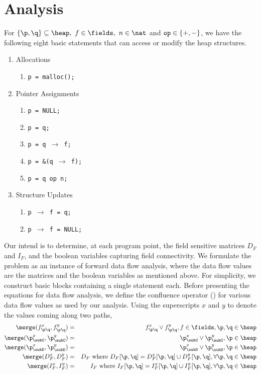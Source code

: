 \chapter{Analysis}\label{ch:Analysis}

For $\{\p, \q\} \subseteq \heap,\ f \in\fields,\ n \in \nat$
and $\mbox{\tt op} \in \{+, -\}$, 
we have the following eight basic statements that can access or modify the heap structures. 
\begin{enumerate}
  \item Allocations
  	\begin{enumerate}
    	\item {\tt p = malloc();}
  	\end{enumerate}
  \item Pointer Assignments
  	\begin{enumerate}
    	\item {\tt p = NULL;}
    	\item {\tt p = q;}
    	\item {\tt p = q $\rightarrow$ f;}
    	\item {\tt p = \&(q $\rightarrow$ f);}
    	\item {\tt p = q op n;}
  	\end{enumerate}
  \item Structure Updates
  	\begin{enumerate}
    	\item {\tt p $\rightarrow$ f = q;}
    	\item {\tt p $\rightarrow$ f = NULL;}
  	\end{enumerate}
\end{enumerate}
Our intend is to determine, at each program point, the field
sensitive matrices $D_F$ and $I_F$, and the
boolean variables capturing field connectivity. We formulate
the problem as an instance of forward data flow analysis,
where the data flow values are the matrices and the boolean
variables as mentioned above.  For simplicity, we construct
basic blocks containing a single statement each. Before
presenting the equations for data flow analysis, we define
the confluence operator (\merge) for various data flow values
as used by our analysis. Using the superscripts $x$ and $y$
to denote the values coming along two paths,
\begin{eqnarray*}
  \merge( f_{\p\q}^x, f_{\p\q}^y ) &=& f_{\p\q}^x \vee f_{\p\q}^y , f \in \fields,
  \p,\q \in \heap \\
   \merge(\p_{\subC}^x, \p_{\subC}^y) &=& \p_{\subC}^x \vee
   \p_{\subC}^y, \p \in \heap \\
   \merge(\p_{\subD}^x, \p_{\subD}^y) &=& \p_{\subD}^x \vee
   \p_{\subD}^y, \p \in \heap \\
   \merge(D_F^{x}, D_F^{y}) &=& D_F \mbox{ where }
   D_F[{\p}, {\q}]  = D_F^{x}[{\p}, {\q}] \cup
   D_F^{y}[{\p}, {\q}],   \forall {\p}, {\q} \in \heap\\ 
   \merge(I_F^{x}, I_F^{y}) &=& I_F \mbox{ where }
   I_F[{\p}, {\q}]  = I_F^{x}[{\p}, {\q}] \cup
   I_F^{y}[{\p}, {\q}],   \forall {\p}, {\q} \in \heap
\end{eqnarray*}
